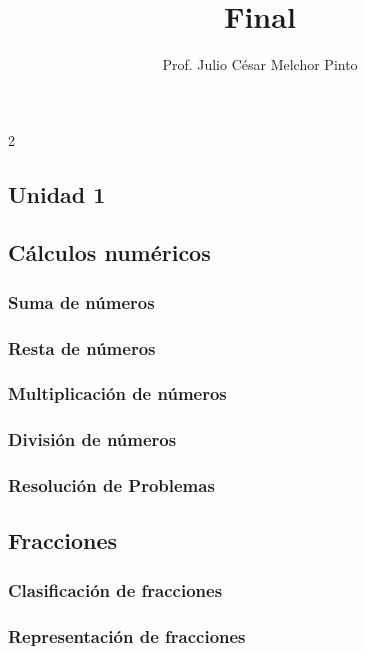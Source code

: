 \documentclass[12pt,repaso,answers]{RDS_unit}
\title{Final}
\author{Prof. Julio César Melchor Pinto}
\begin{document}
\newpage
\begin{multicols}{2}
	\tableofcontents
\end{multicols}
\newpage
\begin{questions}
	\section{Unidad 1}
	\subsection   {Cálculos numéricos}
	\subsubsection{Suma de números}
	\question[1]{}
	\subsubsection{Resta de números}
	\question[1]{}
	\subsubsection{Multiplicación de números}
	\question[1]{}
	\subsubsection{División de números}
	\question[1]{}
	\subsubsection{Resolución de Problemas}
	\question[1]{}
	\subsection   {Fracciones}
	\subsubsection{Clasificación de fracciones}
	\question[1]{}
	\subsubsection{Representación de fracciones}
	\question[1]{}

\end{questions}
\end{document}
